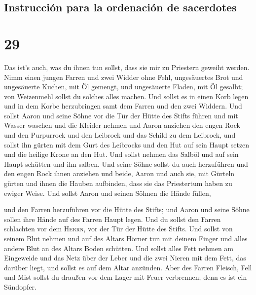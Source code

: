 \hypertarget{instrucciuxf3n-para-la-ordenaciuxf3n-de-sacerdotes}{%
\subsection{Instrucción para la ordenación de
sacerdotes}\label{instrucciuxf3n-para-la-ordenaciuxf3n-de-sacerdotes}}

\hypertarget{section-28}{%
\section{29}\label{section-28}}

 Das ist's auch, was du ihnen tun sollst, dass sie mir zu
Priestern geweiht werden. Nimm einen jungen Farren und zwei Widder ohne
Fehl,  ungesäuertes Brot und ungesäuerte Kuchen, mit Öl
gemengt, und ungesäuerte Fladen, mit Öl gesalbt; von Weizenmehl sollst
du solches alles machen.  Und sollst es in einen Korb
legen und in dem Korbe herzubringen samt dem Farren und den zwei
Widdern.  Und sollst Aaron und seine Söhne vor die Tür der
Hütte des Stifts führen und mit Wasser waschen  und die
Kleider nehmen und Aaron anziehen den engen Rock und den Purpurrock und
den Leibrock und das Schild zu dem Leibrock, und sollst ihn gürten mit
dem Gurt des Leibrocks  und den Hut auf sein Haupt setzen
und die heilige Krone an den Hut.  Und sollst nehmen das
Salböl und auf sein Haupt schütten und ihn salben.  Und
seine Söhne sollst du auch herzuführen und den engen Rock ihnen anziehen
 und beide, Aaron und auch sie, mit Gürteln gürten und
ihnen die Hauben aufbinden, dass sie das Priestertum haben zu ewiger
Weise. Und sollst Aaron und seinen Söhnen die Hände füllen,

 und den Farren herzuführen vor die Hütte des Stifts; und
Aaron und seine Söhne sollen ihre Hände auf des Farren Haupt legen.
 Und du sollst den Farren schlachten vor dem
\textsc{Herrn}, vor der Tür der Hütte des Stifts.  Und
sollst von seinem Blut nehmen und auf des Altars Hörner tun mit deinem
Finger und alles andere Blut an des Altars Boden schütten.
 Und sollst alles Fett nehmen am Eingeweide und das Netz
über der Leber und die zwei Nieren mit dem Fett, das darüber liegt, und
sollst es auf dem Altar anzünden.  Aber des Farren
Fleisch, Fell und Mist sollst du draußen vor dem Lager mit Feuer
verbrennen; denn es ist ein Sündopfer.

